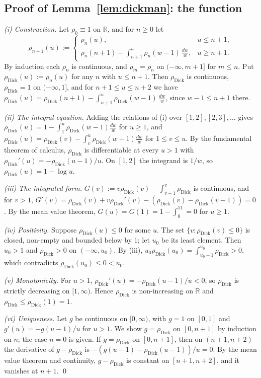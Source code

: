 \documentclass[11pt]{amsart}
\theoremstyle{definition}
\newcommand{\dick}{\rho_{\mathrm{Dick}}}
\begin{document}
\subsection*{Proof of Lemma~\ref{lem:dickman}: the function}
\emph{(i) Construction.} Let $\rho_0\equiv1$ on $\mathbb R$, and for $n\ge0$ let
\[
\rho_{n+1}(u):=\begin{cases}\rho_n(u),&u\le n+1,\\ \rho_n(n+1)-\int_{n+1}^u\rho_n(w-1)\,\frac{dw}w,&u\ge n+1.\end{cases}
\]
By induction each $\rho_n$ is continuous, and $\rho_m=\rho_n$ on $(-\infty,m+1]$ for $m\le n$. Put $\dick(u):=\rho_n(u)$ for any $n$ with $u\le n+1$. Then $\dick$ is continuous, $\dick=1$ on $(-\infty,1]$, and for $n+1\le u\le n+2$ we have $\dick(u)=\dick(n+1)-\int_{n+1}^u\dick(w-1)\,\frac{dw}w$, since $w-1\le n+1$ there.

\emph{(ii) The integral equation.} Adding the relations of (i) over $[1,2],[2,3],\dots$ gives $\dick(u)=1-\int_1^u\dick(w-1)\frac{dw}w$ for $u\ge1$, and $\dick(u)=\dick(v)-\int_v^u\dick(w-1)\frac{dw}w$ for $1\le v\le u$. By the fundamental theorem of calculus, $\dick$ is differentiable at every $u>1$ with $\dick'(u)=-\dick(u-1)/u$. On $[1,2]$ the integrand is $1/w$, so $\dick(u)=1-\log u$.

\emph{(iii) The integrated form.} $G(v):=v\dick(v)-\int_{v-1}^v\dick$ is continuous, and for $v>1$, $G'(v)=\dick(v)+v\dick'(v)-(\dick(v)-\dick(v-1))=0$. By the mean value theorem, $G(u)=G(1)=1-\int_0^11=0$ for $u\ge1$.

\emph{(iv) Positivity.} Suppose $\dick(u)\le0$ for some $u$. The set $\{v:\dick(v)\le0\}$ is closed, non-empty and bounded below by $1$; let $u_0$ be its least element. Then $u_0>1$ and $\dick>0$ on $(-\infty,u_0)$. By (iii), $u_0\dick(u_0)=\int_{u_0-1}^{u_0}\dick>0$, which contradicts $\dick(u_0)\le0<u_0$.

\emph{(v) Monotonicity.} For $u>1$, $\dick'(u)=-\dick(u-1)/u<0$, so $\dick$ is strictly decreasing on $[1,\infty)$. Hence $\dick$ is non-increasing on $\mathbb R$ and $\dick\le\dick(1)=1$.

\emph{(vi) Uniqueness.} Let $g$ be continuous on $[0,\infty)$, with $g=1$ on $[0,1]$ and $g'(u)=-g(u-1)/u$ for $u>1$. We show $g=\dick$ on $[0,n+1]$ by induction on $n$; the case $n=0$ is given. If $g=\dick$ on $[0,n+1]$, then on $(n+1,n+2)$ the derivative of $g-\dick$ is $-(g(u-1)-\dick(u-1))/u=0$. By the mean value theorem and continuity, $g-\dick$ is constant on $[n+1,n+2]$, and it vanishes at $n+1$. \qed
\end{document}
